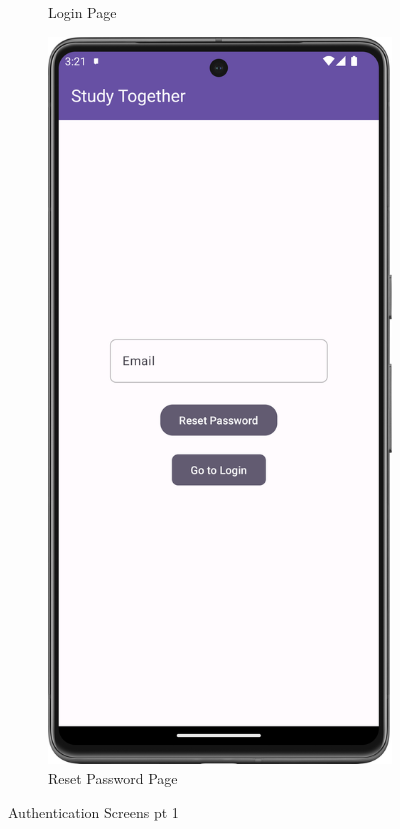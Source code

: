 \begin{figure}[H]
\begin{subfigure}[b]{0.3\textwidth}
    \caption{Login Page}
    \label{fig:login}
  \end{subfigure}
  \hfill
  \begin{subfigure}[b]{0.3\textwidth}
    \includegraphics[width=\textwidth]{Figures/Product_Images/Auth/reset_password.png}
    \caption{Reset Password Page}
    \label{fig:reset_password}
  \end{subfigure}
  \caption{Authentication Screens pt 1}
  \label{fig:Authentication_screens_1}
\end{figure}

